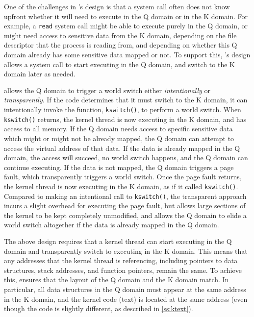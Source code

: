 One of the challenges in \sys's design is that a system call often does
not know upfront whether it will need to execute in the Q domain or in
the K domain.  For example, a \texttt{read} system call might be able to
execute purely in the Q domain, or might need access to sensitive data
from the K domain, depending on the file descriptor that the process is
reading from, and depending on whether this Q domain already has some
sensitive data mapped or not.  To support this, \sys's design allows
a system call to start executing in the Q domain, and switch to the K
domain later as needed.

\sys allows the Q domain to trigger a world switch either
\textit{intentionally} or \textit{transparently}.  If the code
determines that it must switch to the K domain, it can intentionally
invoke the function, \texttt{kswitch()}, to perform a world switch.
When \texttt{kswitch()} returns, the kernel thread is now executing in
the K domain, and has access to all memory.  If the Q domain needs
access to specific sensitive data which might or might not be already
mapped, the Q domain can attempt to access the virtual address of that
data.  If the data is already mapped in the Q domain, the access will
succeed, no world switch happens, and the Q domain can continue
executing.  If the data is not mapped, the Q domain triggers a page
fault, which transparently triggers a world switch.  Once the page
fault returns, the kernel thread is now executing in the K domain, as
if it called \texttt{kswitch()}.  Compared to making an intentional
call to \texttt{kswitch()}, the transparent approach incurs a slight
overhead for executing the page fault, but allows large sections of
the kernel to be kept completely unmodified, and allows the Q domain
to elide a world switch altogether if the data is already mapped in
the Q domain.

The above design requires that a kernel thread can start executing in
the Q domain and transparently switch to executing in the K domain.
This means that any addresses that the kernel thread is referencing,
including pointers to data structures, stack addresses, and function
pointers, remain the same.  To achieve this, \sys ensures that the
layout of the Q domain and the K domain match.  In particular, all
data structures in the Q domain must appear at the same address in the
K domain, and the kernel code (text) is located at the same address
(even though the code is slightly different, as described in \autoref{ss:ktext}).

